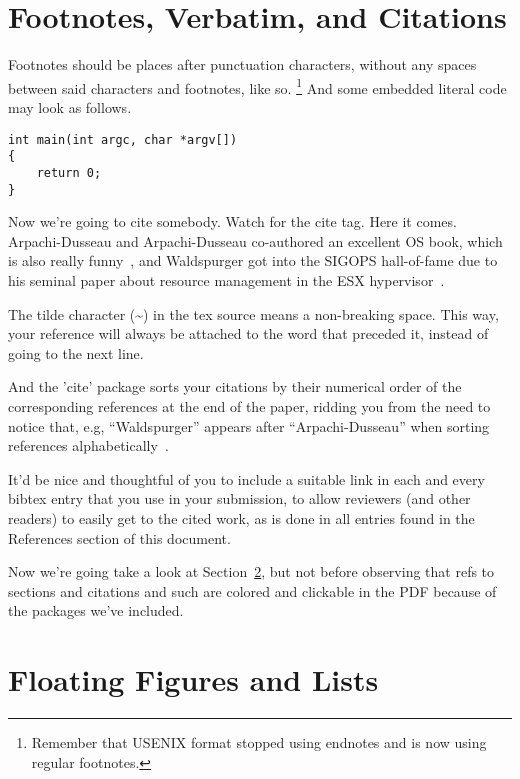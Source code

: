 \section{Footnotes, Verbatim, and Citations}

Footnotes should be places after punctuation characters, without any
spaces between said characters and footnotes, like so.%
\footnote{Remember that USENIX format stopped using endnotes and is
  now using regular footnotes.} And some embedded literal code may
look as follows.

\begin{verbatim}
int main(int argc, char *argv[]) 
{
    return 0;
}
\end{verbatim}

Now we're going to cite somebody. Watch for the cite tag. Here it
comes. Arpachi-Dusseau and Arpachi-Dusseau co-authored an excellent OS
book, which is also really funny~\cite{arpachiDusseau18:osbook}, and
Waldspurger got into the SIGOPS hall-of-fame due to his seminal paper
about resource management in the ESX hypervisor~\cite{waldspurger02}.

The tilde character (\~{}) in the tex source means a non-breaking
space. This way, your reference will always be attached to the word
that preceded it, instead of going to the next line.

And the 'cite' package sorts your citations by their numerical order
of the corresponding references at the end of the paper, ridding you
from the need to notice that, e.g, ``Waldspurger'' appears after
``Arpachi-Dusseau'' when sorting references
alphabetically~\cite{waldspurger02,arpachiDusseau18:osbook}. 

It'd be nice and thoughtful of you to include a suitable link in each
and every bibtex entry that you use in your submission, to allow
reviewers (and other readers) to easily get to the cited work, as is
done in all entries found in the References section of this document.

Now we're going take a look at Section~\ref{sec:figs}, but not before
observing that refs to sections and citations and such are colored and
clickable in the PDF because of the packages we've included.

\section{Floating Figures and Lists}
\label{sec:figs}


